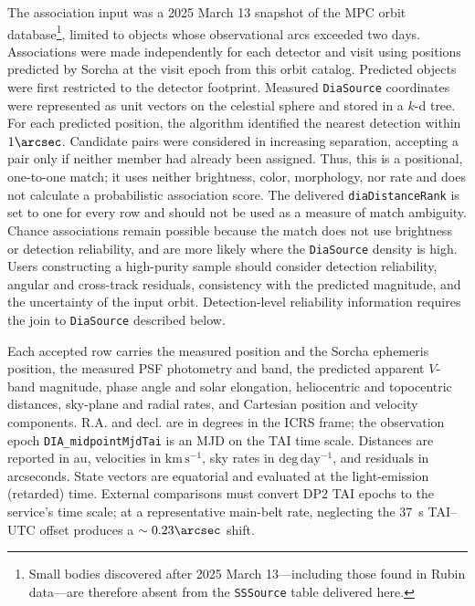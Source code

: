 The association input was a 2025 March 13 snapshot of the \gls{MPC} orbit
database\footnote{Small bodies discovered after 2025 March 13---including those
found in Rubin data---are therefore absent from the \texttt{SSSource} table
delivered here.}, limited to objects whose observational arcs exceeded two
days.
Associations were made independently for each detector and visit using
positions predicted by Sorcha
\citep[][]{2025AJ....170..100M,2025AJ....170...97H} at the visit epoch from
this orbit catalog.
Predicted objects were first restricted to the detector \gls{footprint}.  Measured
\texttt{DiaSource} coordinates were represented as unit vectors on the
celestial sphere and stored in a $k$-d tree.  For each predicted position, the
\gls{algorithm} identified the nearest detection within $1\arcsec$.  Candidate
pairs were considered in increasing separation, accepting a pair only if
neither member had already been assigned.  Thus, this is a positional,
one-to-one match; it uses neither brightness, color, morphology, nor rate and
does not calculate a probabilistic association score.  The delivered
\texttt{diaDistanceRank} is set to one for every row and should not be used as
a measure of match ambiguity.  Chance associations remain possible because
the match does not use brightness or detection reliability, and are more
likely where the \texttt{DiaSource} density is high.  Users constructing a
high-purity sample should consider detection reliability, angular and
cross-track residuals, consistency with the predicted magnitude, and the
uncertainty of the input orbit.  Detection-level reliability information
requires the join to \texttt{DiaSource} described below.

Each accepted row carries the measured position and the Sorcha \gls{ephemeris}
position, the measured \gls{PSF} photometry and band, the predicted apparent
$V$-band magnitude, phase angle and solar elongation, heliocentric and
topocentric distances, sky-plane and radial rates, and Cartesian position and
velocity components.  R.A. and decl. are in degrees in the \gls{ICRS} frame;
the observation \gls{epoch} \texttt{DIA\_midpointMjdTai} is an MJD on the TAI time
scale.  Distances are reported in \gls{au}, velocities in
$\mathrm{km\,s^{-1}}$, sky rates in $\mathrm{deg\,day^{-1}}$, and residuals
in arcseconds.  State vectors are equatorial and evaluated at the
light-emission (retarded) time.  External comparisons must convert \gls{DP2} TAI
epochs to the service's time scale; at a representative main-belt rate,
neglecting the 37~s \gls{TAI}--UTC offset produces a $\sim0.23\arcsec$ shift.

